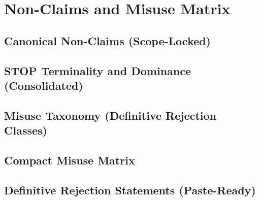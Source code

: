 ﻿%

\section{Non-Claims and Misuse Matrix}

\subsection{Canonical Non-Claims (Scope-Locked)}

\subsection{STOP Terminality and Dominance (Consolidated)}

\subsection{Misuse Taxonomy (Definitive Rejection Classes)}

\subsection{Compact Misuse Matrix}

\subsection{Definitive Rejection Statements (Paste-Ready)}
